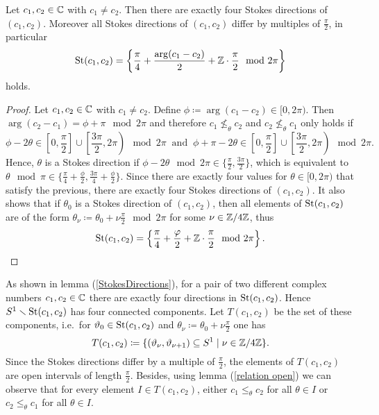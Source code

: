 \begin{lem}\label{StokesDirections}
    Let $c_1,c_2 \in \mathbb{C}$ with $c_1 \neq c_2$. Then there are exactly four Stokes directions of $(c_1,c_2)$. Moreover all Stokes directions of $(c_1,c_2)$ differ by multiples of $\frac{\pi}{2}$, in particular
    \[
    \operatorname{St}(c_1,c_2) = \left\{\frac{\pi}{4}+ \frac{\arg(c_1-c_2)}{2} + \mathbb{Z}\cdot \frac{\pi}{2} \mod 2\pi\right\}
    \]
    holds.
\end{lem}
\begin{proof}
Let $c_1,c_2 \in \mathbb{C}$ with $c_1 \neq c_2$. Define $\phi \coloneqq \arg(c_1 -c_2) \in [0, 2\pi)$. Then $\arg(c_2-c_1) = \phi+\pi \mod 2\pi$ and therefore $c_1 \not\leq_{\theta} c_2$ and $c_2 \not\leq_{\theta} c_1$ only holds if
    \[
    \phi - 2 \theta \in \left[0, \frac{\pi}{2}\right] \cup \left[\frac{3\pi}{2}, 2\pi\right) \mod 2\pi ~\text{ and }~ \phi+\pi - 2 \theta \in \left[0, \frac{\pi}{2}\right] \cup \left[\frac{3\pi}{2}, 2\pi\right) \mod 2\pi.
    \] Hence, $\theta$ is a Stokes direction if $\phi -2 \theta \mod2\pi \in \{\frac{\pi}{2}, \frac{3\pi}{2}\}$, which is equivalent to $\theta \mod \pi \in \{\frac{\pi}{4}+\frac{\phi}{2}, \frac{3\pi}{4}+\frac{\phi}{2}\}$. Since there are exactly four values for $\theta \in [0,2\pi)$ that satisfy the previous, there are exactly four Stokes directions of $(c_1,c_2)$. It also shows that if $\theta_0$ is a Stokes direction of $(c_1,c_2)$, then all elements of $\operatorname{St}(c_1,c_2)$ are of the form $\theta_\nu \coloneqq \theta_0 + \nu\frac{\pi}{2} \mod 2\pi$ for some $\nu \in \mathbb{Z}/4\mathbb{Z}$, thus \[\operatorname{St}(c_1,c_2) = \left\{\frac{\pi}{4}+ \frac{\varphi}{2} + \mathbb{Z}\cdot \frac{\pi}{2} \mod 2\pi\right\}.\]
\end{proof}

\begin{nota}\label{connected components}
As shown in lemma (\ref{StokesDirections}), for a pair of two different complex numbers $c_1, c_2 \in \mathbb{C}$ there are exactly four directions in $\operatorname{St}(c_1,c_2)$. Hence $S^1\smallsetminus \operatorname{St}(c_1,c_2)$ has four connected components. Let $T(c_1,c_2)$ be the set of these components, i.e.\ for $\vartheta_0 \in \operatorname{St}(c_1,c_2)$ and $\theta_\nu \coloneqq \theta_0 + \nu\frac{\pi}{2}$ one has \[T(c_1,c_2)\coloneqq\{(\vartheta_\nu, \vartheta_{\nu+1}) \subseteq S^1 \mid \nu \in \mathbb{Z}/4\mathbb{Z}\}.\]
Since the Stokes directions differ by a multiple of $\frac{\pi}{2}$, the elements of $T(c_1,c_2)$ are open intervals of length $\frac{\pi}{2}$. Besides, using lemma (\ref{relation open}) we can observe that for every element $I \in T(c_1,c_2)$, either $c_1 \leq_{\theta} c_2$ for all $\theta \in I$ or $c_2 \leq_{\theta} c_1$ for all $\theta \in I$.
\end{nota}

